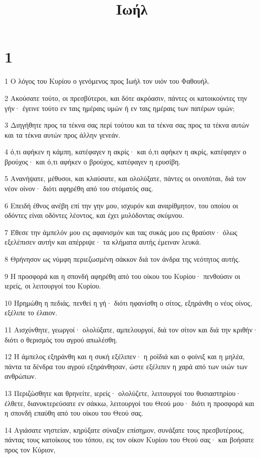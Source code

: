 

\title{Ιωήλ}


\chapter{1}

\par 1 Ο λόγος του Κυρίου ο γενόμενος προς Ιωήλ τον υιόν του Φαθουήλ.
\par 2 Ακούσατε τούτο, οι πρεσβύτεροι, και δότε ακρόασιν, πάντες οι κατοικούντες την γήν· έγεινε τούτο εν ταις ημέραις υμών ή εν ταις ημέραις των πατέρων υμών;
\par 3 Διηγήθητε προς τα τέκνα σας περί τούτου και τα τέκνα σας προς τα τέκνα αυτών και τα τέκνα αυτών προς άλλην γενεάν.
\par 4 ό,τι αφήκεν η κάμπη, κατέφαγεν η ακρίς· και ό,τι αφήκεν η ακρίς, κατέφαγεν ο βρούχος· και ό,τι αφήκεν ο βρούχος, κατέφαγεν η ερυσίβη.
\par 5 Ανανήψατε, μέθυσοι, και κλαύσατε, και ολολύξατε, πάντες οι οινοπόται, διά τον νέον οίνον· διότι αφηρέθη από του στόματός σας.
\par 6 Επειδή έθνος ανέβη επί την γην μου, ισχυρόν και αναρίθμητον, του οποίου οι οδόντες είναι οδόντες λέοντος, και έχει μυλόδοντας σκύμνου.
\par 7 Έθεσε την άμπελόν μου εις αφανισμόν και τας συκάς μου εις θραύσιν· όλως εξελέπισεν αυτήν και απέρριψε· τα κλήματα αυτής έμειναν λευκά.
\par 8 Θρήνησον ως νύμφη περιεζωσμένη σάκκον διά τον άνδρα της νεότητος αυτής.
\par 9 Η προσφορά και η σπονδή αφηρέθη από του οίκου του Κυρίου· πενθούσιν οι ιερείς, οι λειτουργοί του Κυρίου.
\par 10 Ηρημώθη η πεδιάς, πενθεί η γή· διότι ηφανίσθη ο σίτος, εξηράνθη ο νέος οίνος, εξέλιπε το έλαιον.
\par 11 Αισχύνθητε, γεωργοί· ολολύξατε, αμπελουργοί, διά τον σίτον και διά την κριθήν· διότι ο θερισμός του αγρού απωλέσθη.
\par 12 Η άμπελος εξηράνθη και η συκή εξέλιπεν· η ροϊδιά και ο φοίνιξ και η μηλέα, πάντα τα δένδρα του αγρού εξηράνθησαν, ώστε εξέλιπεν η χαρά από των υιών των ανθρώπων.
\par 13 Περιζώσθητε και θρηνείτε, ιερείς· ολολύζετε, λειτουργοί του θυσιαστηρίου· έλθετε, διανυκτερεύσατε εν σάκκω, λειτουργοί του Θεού μου· διότι η προσφορά και η σπονδή επαύθη από του οίκου του Θεού σας.
\par 14 Αγιάσατε νηστείαν, κηρύξατε σύναξιν επίσημον, συνάξατε τους πρεσβυτέρους, πάντας τους κατοίκους του τόπου, εις τον οίκον Κυρίου του Θεού σας· και βοήσατε προς τον Κύριον,
